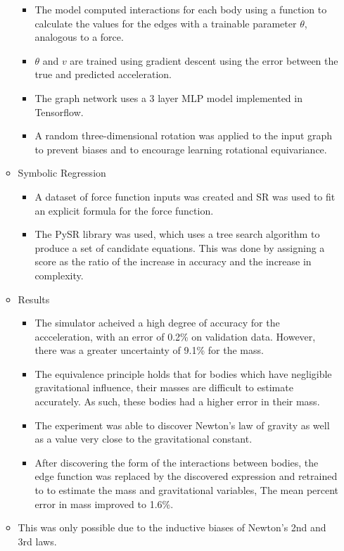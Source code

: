 \documentclass[fleqn,10pt]{olplainarticle}
\begin{document}
\begin{itemize}
\begin{itemize}
\begin{itemize}
                        \item The model computed interactions for each body using a function to calculate the values for the edges with a trainable parameter $\theta$, analogous to a force.
                        \item $\theta$ and $v$ are trained using gradient descent using the error between the true and predicted acceleration.
                        \item The graph network uses a 3 layer MLP model implemented in Tensorflow.
                        \item A random three-dimensional rotation was applied to the input graph to prevent biases and to encourage learning rotational equivariance.
                    \end{itemize}
              \item Symbolic Regression
                    \begin{itemize}
                        \item A dataset of force function inputs was created and SR was used to fit an explicit formula for the force function.
                        \item The PySR library was used, which uses a tree search algorithm to produce a set of candidate equations. This was done by assigning a score as the ratio of the increase in accuracy and the increase in complexity.
                    \end{itemize}
              \item Results
                    \begin{itemize}
                        \item The simulator acheived a high degree of accuracy for the accceleration, with an error of 0.2\% on validation data. However, there was a greater uncertainty of 9.1\% for the mass.
                        \item The equivalence principle holds that for bodies which have negligible gravitational influence, their masses are difficult to estimate accurately. As such, these bodies had a higher error in their mass.
                        \item The experiment was able to discover Newton's law of gravity as well as a value very close to the gravitational constant.
                        \item After discovering the form of the interactions between bodies, the edge function was replaced by the discovered expression and retrained to to estimate the mass and gravitational variables, The mean percent error in mass improved to 1.6\%.
                    \end{itemize}
              \item This was only possible due to the inductive biases of Newton's 2nd and 3rd laws.
          \end{itemize}
\end{itemize}
\end{document}
